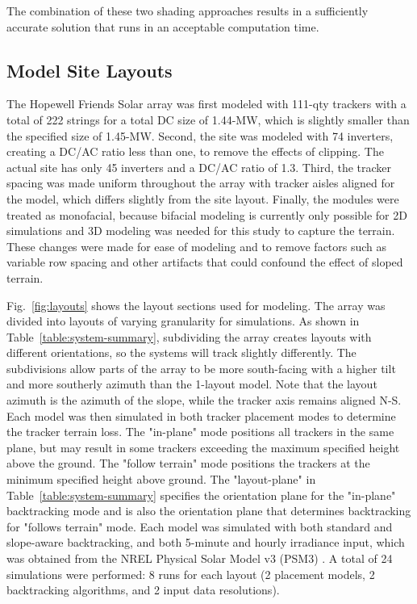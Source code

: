 \documentclass[conference]{IEEEtran}
\begin{document}
The combination of these two shading approaches results in a sufficiently accurate solution that runs in an acceptable computation time.

\subsection{Model Site Layouts}

The Hopewell Friends Solar array was first modeled with 111-qty trackers with a total of 222 strings for a total DC size of 1.44-MW, which is slightly smaller than the specified size of 1.45-MW. Second, the site was modeled with 74 inverters, creating a DC/AC ratio less than one, to remove the effects of clipping. The actual site has only 45 inverters and a DC/AC ratio of 1.3. Third, the tracker spacing was made uniform throughout the array with tracker aisles aligned for the model, which differs slightly from the site layout. Finally, the modules were treated as monofacial, because bifacial modeling is currently only possible for 2D simulations and 3D modeling was needed for this study to capture the terrain. These changes were made for ease of modeling and to remove factors such as variable row spacing and other artifacts that could confound the effect of sloped terrain.

Fig.~\ref{fig:layouts} shows the layout sections used for modeling. The array was divided into layouts of varying granularity for simulations. As shown in Table~\ref{table:system-summary}, subdividing the array creates layouts with different orientations, so the systems will track slightly differently. The subdivisions allow parts of the array to be more south-facing with a higher tilt and more southerly azimuth than the 1-layout model. Note that the layout azimuth is the azimuth of the slope, while the tracker axis remains aligned N-S. Each model was then simulated in both tracker placement modes to determine the tracker terrain loss. The "in-plane" mode positions all trackers in the same plane, but may result in some trackers exceeding the maximum specified height above the ground. The "follow terrain" mode positions the trackers at the minimum specified height above ground. The "layout-plane" in Table~\ref{table:system-summary} specifies the orientation plane for the "in-plane" backtracking mode and is also the orientation plane that determines backtracking for "follows terrain" mode. Each model was simulated with both standard \cite{Marion2013} and slope-aware \cite{Anderson2020} backtracking, and both 5-minute and hourly irradiance input, which was obtained from the NREL Physical Solar Model v3 (PSM3) \cite{Sengupta2018}. A total of 24 simulations were performed: 8 runs for each layout (2 placement models, 2 backtracking algorithms, and 2 input data resolutions).
\end{document}
